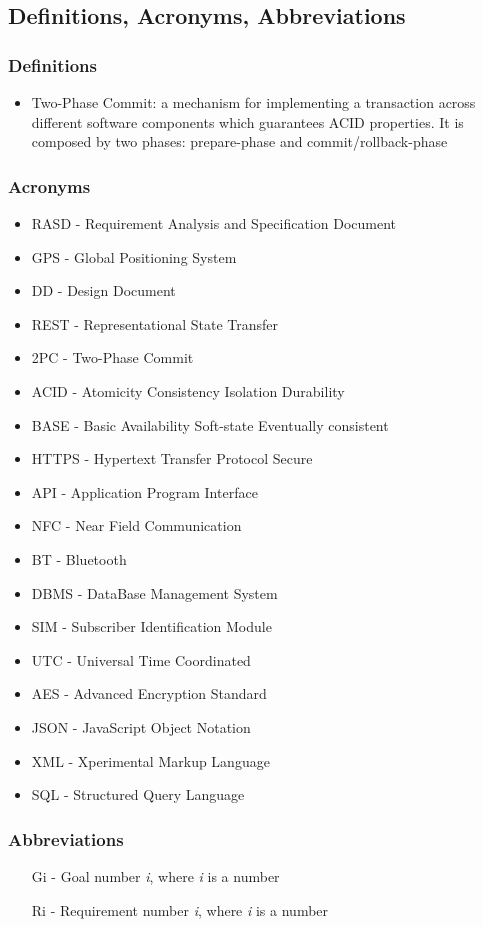 \subsection{Definitions, Acronyms, Abbreviations}

\subsubsection{Definitions}
\begin{itemize}
\item Two-Phase Commit: a mechanism for implementing a transaction across different software components which guarantees ACID properties. It is composed by two phases: prepare-phase and commit/rollback-phase
\end{itemize}

\subsubsection{Acronyms}
\begin{itemize}
\item RASD - Requirement Analysis and Specification Document
\item GPS - Global Positioning System
\item DD - Design Document
\item REST - Representational State Transfer
\item 2PC - Two-Phase Commit
\item ACID - Atomicity Consistency Isolation Durability
\item BASE - Basic Availability Soft-state Eventually consistent
\item HTTPS - Hypertext Transfer Protocol Secure
\item API - Application Program Interface
\item NFC - Near Field Communication
\item BT - Bluetooth
\item DBMS - DataBase Management System
\item SIM - Subscriber Identification Module
\item UTC - Universal Time Coordinated
\item AES - Advanced Encryption Standard
\item JSON - JavaScript Object Notation
\item XML - Xperimental Markup Language
\item SQL - Structured Query Language
\end{itemize}

\subsubsection{Abbreviations}
\begin{itemize}
\item [Gi] - Goal number \textit{i}, where \textit{i} is a number
\item [Ri] - Requirement number \textit{i}, where \textit{i} is a number
\end{itemize}
